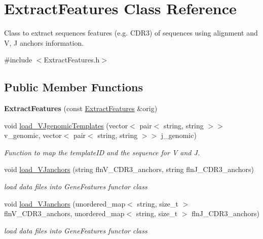 \hypertarget{classExtractFeatures}{}\section{Extract\+Features Class Reference}
\label{classExtractFeatures}


Class to extract sequences features (e.\+g. C\+D\+R3) of sequences using alignment and V, J anchors information.  




{\ttfamily \#include $<$Extract\+Features.\+h$>$}

\subsection*{Public Member Functions}
\begin{DoxyCompactItemize}
\item 
\mbox{\label{classExtractFeatures_a7b288f4e64f388d34f1e0cd63cd2dcf6}} 
{\bfseries Extract\+Features} (const \hyperlink{classExtractFeatures}{Extract\+Features} \&orig)
\item 
void \hyperlink{classExtractFeatures_a70b5cef5ad48234649b114dea3eba942}{load\+\_\+\+V\+Jgenomic\+Templates} (vector$<$ pair$<$ string, string $>$$>$ v\+\_\+genomic, vector$<$ pair$<$ string, string $>$$>$ j\+\_\+genomic)
\begin{DoxyCompactList}\small\item\em Function to map the template\+ID and the sequence for V and J. \end{DoxyCompactList}\item 
void \hyperlink{classExtractFeatures_a05f401f4f39adb7f33c2b1e3f7f51807}{load\+\_\+\+V\+Janchors} (string fln\+V\+\_\+\+C\+D\+R3\+\_\+anchors, string fln\+J\+\_\+\+C\+D\+R3\+\_\+anchors)
\begin{DoxyCompactList}\small\item\em load data files into Gene\+Features functor class \end{DoxyCompactList}\item 
void \hyperlink{classExtractFeatures_ace6992bcea2ed1008b5a103291f039c4}{load\+\_\+\+V\+Janchors} (unordered\+\_\+map$<$ string, size\+\_\+t $>$ fln\+V\+\_\+\+C\+D\+R3\+\_\+anchors, unordered\+\_\+map$<$ string, size\+\_\+t $>$ fln\+J\+\_\+\+C\+D\+R3\+\_\+anchors)
\begin{DoxyCompactList}\small\item\em load data files into Gene\+Features functor class \end{DoxyCompactList}\item 

\end{DoxyCompactItemize}
